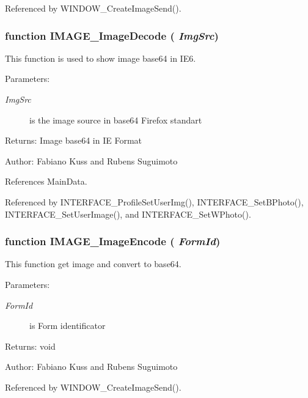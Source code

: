 Referenced by WINDOW\_\-CreateImageSend().
\subsubsection[IMAGE\_\-ImageDecode]{\setlength{\rightskip}{0pt plus 5cm}function IMAGE\_\-ImageDecode ( {\em ImgSrc})}\label{images_8js_b30c8fcfb236ffef982f2f2426dbd315}


This function is used to show image base64 in IE6. 

\begin{Desc}
\item[Parameters:]
\begin{description}
\item[{\em ImgSrc}]is the image source in base64 Firefox standart \end{description}
\end{Desc}
\begin{Desc}
\item[Returns:]Image base64 in IE Format \end{Desc}
\begin{Desc}
\item[Author:]Fabiano Kuss and Rubens Suguimoto \end{Desc}


References MainData.

Referenced by INTERFACE\_\-ProfileSetUserImg(), INTERFACE\_\-SetBPhoto(), INTERFACE\_\-SetUserImage(), and INTERFACE\_\-SetWPhoto().
\subsubsection[IMAGE\_\-ImageEncode]{\setlength{\rightskip}{0pt plus 5cm}function IMAGE\_\-ImageEncode ( {\em FormId})}\label{images_8js_98f95c69487bf844901b854912bd62de}


This function get image and convert to base64. 

\begin{Desc}
\item[Parameters:]
\begin{description}
\item[{\em FormId}]is Form identificator \end{description}
\end{Desc}
\begin{Desc}
\item[Returns:]void \end{Desc}
\begin{Desc}
\item[Author:]Fabiano Kuss and Rubens Suguimoto \end{Desc}


Referenced by WINDOW\_\-CreateImageSend().